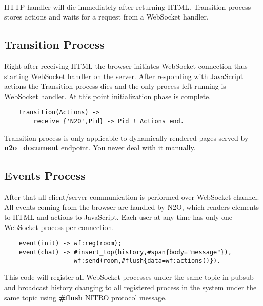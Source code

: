 \paragraph{}
HTTP handler will die immediately after returning HTML. Transition process
stores actions and waits for a request from a WebSocket handler.

\subsection{Transition Process}
Right after receiving HTML the browser initiates WebSocket connection
thus starting WebSocket handler on the server. After responding with
JavaScript actions the Transition process dies and the only process left
running is WebSocket handler. At this point initialization phase is complete.

\vspace{1\baselineskip}
\begin{lstlisting}
    transition(Actions) ->
        receive {'N2O',Pid} -> Pid ! Actions end.
\end{lstlisting}
\vspace{1\baselineskip}

Transition process is only applicable to dynamically rendered pages
served by {\bf n2o\_document} endpoint. You never deal with it manually.

\subsection{Events Process}
After that all client/server communication is performed over
WebSocket channel. All events coming from the browser are
handled by N2O, which renders elements to HTML and actions to
JavaScript. Each user at any time has only one WebSocket process
per connection.

\vspace{1\baselineskip}
\begin{lstlisting}
    event(init) -> wf:reg(room);
    event(chat) -> #insert_top(history,#span{body="message"}),
                   wf:send(room,#flush{data=wf:actions()}).
\end{lstlisting}
\vspace{1\baselineskip}

This code will register all WebSocket processes under the same
topic in pubsub and broadcast history changing to all registered
process in the system under the same topic using {\bf \#flush}
NITRO protocol message.

